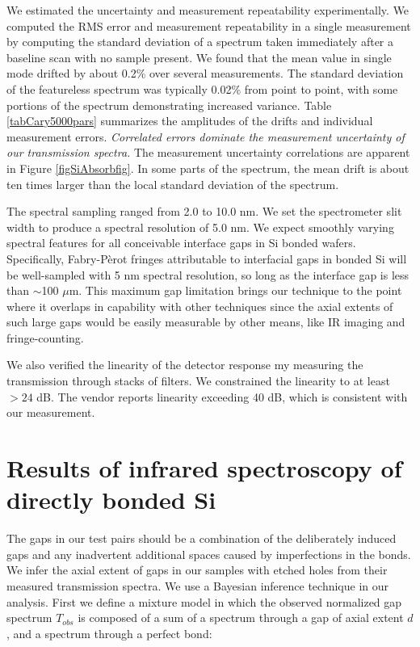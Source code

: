 \documentclass[osajnl,preprint,showpacs,superscriptaddress,12pt]{revtex4-1} %
\begin{document}
We estimated the uncertainty and measurement repeatability experimentally.  We computed the RMS error and measurement repeatability in a single measurement by computing the standard deviation of a spectrum taken immediately after a baseline scan with no sample present.  We found that the mean value in single mode drifted by about 0.2\% over several measurements.  The standard deviation of the featureless spectrum was typically 0.02\% from point to point, with some portions of the spectrum demonstrating increased variance.  Table \ref{tabCary5000pars} summarizes the amplitudes of the drifts and individual measurement errors.  \emph{Correlated errors dominate the measurement uncertainty of our transmission spectra.}  The measurement uncertainty correlations are apparent in Figure \ref{figSiAbsorbfig}.  In some parts of the spectrum, the mean drift is about ten times larger than the local standard deviation of the spectrum.

The spectral sampling ranged from 2.0 to 10.0 nm.  We set the spectrometer slit width to produce a spectral resolution of 5.0 nm.  We expect smoothly varying spectral features for all conceivable interface gaps in Si bonded wafers.  Specifically, Fabry-P\`erot fringes attributable to interfacial gaps in bonded Si will be well-sampled with 5 nm spectral resolution, so long as the interface gap is less than $\sim$100 $\mu$m.  This maximum gap limitation brings our technique to the point where it overlaps in capability with other techniques since the axial extents of such large gaps would be easily measurable by other means, like IR imaging and fringe-counting.

We also verified the linearity of the detector response my measuring the transmission through stacks of filters.  We constrained the linearity to at least $>24$ dB.  The vendor reports linearity exceeding 40 dB, which is consistent with our measurement.  




\section{Results of infrared spectroscopy of directly bonded Si}
\label{secResults}

The gaps in our test pairs should be a combination of the deliberately induced gaps and any inadvertent additional spaces caused by imperfections in the bonds.  We infer the axial extent of gaps in our samples with etched holes from their measured transmission spectra.  We use a Bayesian inference technique in our analysis.  First we define a mixture model in which the observed normalized gap spectrum $T_{obs}$ is composed of a sum of a spectrum through a gap of axial extent $d$, and a spectrum through a perfect bond:
\end{document}
